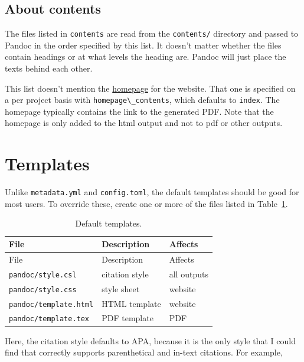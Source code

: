 \documentclass[
  14pt
  american,
  paper=a4,
  ,captions=tableheading
]{scrreprt}
\newcommand{\passthrough}[1]{#1}
\begin{document}
\hypertarget{sec:about_contents}{%
\subsection{About contents}\label{sec:about_contents}}

The files listed in \passthrough{\lstinline!contents!} are read from the
\passthrough{\lstinline!contents/!} directory and passed to Pandoc in
the order specified by this list. It doesn't matter whether the files
contain headings or at what levels the heading are. Pandoc will just
place the texts behind each other.

This list doesn't mention the \href{/}{homepage} for the website. That
one is specified on a per project basis with
\passthrough{\lstinline!homepage\_contents!}, which defaults to
\passthrough{\lstinline!index!}. The homepage typically contains the
link to the generated PDF. Note that the homepage is only added to the
html output and not to pdf or other outputs.

\hypertarget{sec:templates}{%
\section{Templates}\label{sec:templates}}

Unlike \passthrough{\lstinline!metadata.yml!} and
\passthrough{\lstinline!config.toml!}, the default templates should be
good for most users. To override these, create one or more of the files
listed in Table~\ref{tbl:templates}.

\hypertarget{tbl:templates}{}
\begin{longtable}[]{@{}lll@{}}
\caption{\label{tbl:templates}Default templates.}\tabularnewline
\toprule
File & Description & Affects \\
\midrule
\endfirsthead
\toprule
File & Description & Affects \\
\midrule
\endhead
\passthrough{\lstinline!pandoc/style.csl!} & citation style & all
outputs \\
\passthrough{\lstinline!pandoc/style.css!} & style sheet & website \\
\passthrough{\lstinline!pandoc/template.html!} & HTML template &
website \\
\passthrough{\lstinline!pandoc/template.tex!} & PDF template & PDF \\
\bottomrule
\end{longtable}

Here, the citation style defaults to APA, because it is the only style
that I could find that correctly supports parenthetical and in-text
citations. For example,
\end{document}
